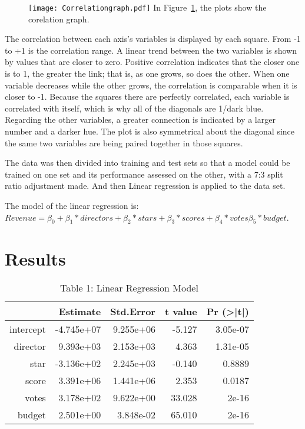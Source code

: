 \documentclass[12pt]{article}
\begin{document}
\begin{figure}
  \centering
	\texttt{[image: Correlationgraph.pdf]}
	\label{fig:Correlationgraph}
In Figure~\ref{fig:Correlationgraph}, the plots show the corelation graph.
\end{figure}

The correlation between each axis’s variables is displayed by each square. From 
-1 to +1 is the correlation range. A linear trend between the two variables is shown
by values that are closer to zero. Positive correlation indicates that the closer one 
is to 1, the greater the link; that is, as one grows, so does the other. When one variable 
decreases while the other grows, the correlation is comparable when it is closer to -1.
Because the squares there are perfectly correlated, each variable is correlated with itself,
which is why all of the diagonals are 1/dark blue. Regarding the other variables, a greater 
connection is indicated by a larger number and a darker hue. The plot is also symmetrical
about the diagonal since the same two variables are being paired together in those squares.

The data was then divided into training and test sets so that a model could be 
trained on one set and its performance assessed on the other, with a 7:3 split 
ratio adjustment made. And then Linear regression is applied to 
the data set.

The model of the linear regression is:
$Revenue = \beta_0 +\beta_1*directors + \beta_2*stars + \beta_3*scores + \beta_4*votes \beta_5*budget$.

\section{Results}
\label{sec:res}

\begin{table}[h]
\caption{Table 1: Linear Regression Model}
\centering
\begin{tabular}{rrrrr}
\hline
 & Estimate   & Std.Error & t value & Pr (\textgreater|t|) \\
 \hline
intercept & -4.745e+07 & 9.255e+06 & -5.127  & 3.05e-07 \\ 
director  & 9.393e+03  & 2.153e+03 & 4.363   & 1.31e-05 \\ 
star      & -3.136e+02 & 2.245e+03 & -0.140  & 0.8889 \\ 
score     & 3.391e+06  & 1.441e+06 & 2.353   & 0.0187 \\ 
votes     & 3.178e+02  & 9.622e+00 & 33.028  & 2e-16 \\ 
budget    & 2.501e+00  & 3.848e-02 & 65.010  & 2e-16 \\
\hline
\end{tabular}
\end{table}
\end{document}
